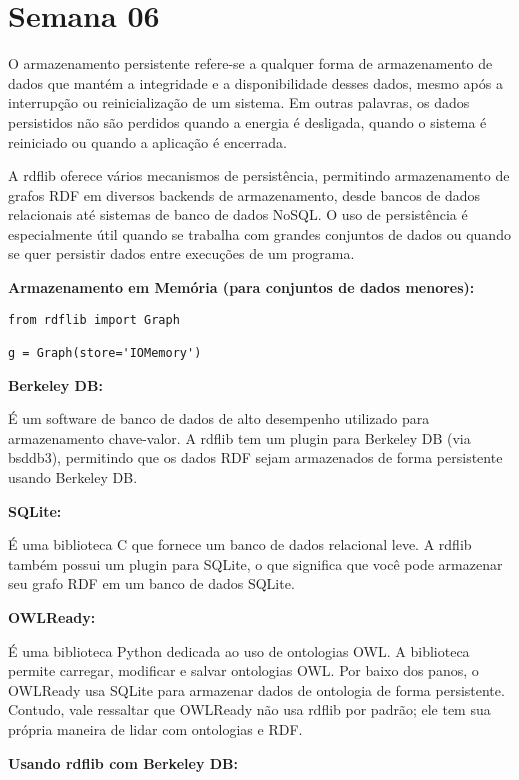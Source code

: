 \section{Semana 06}


O armazenamento persistente refere-se a qualquer forma de armazenamento de dados que mantém a integridade e a disponibilidade desses dados, mesmo após a interrupção ou reinicialização de um sistema. Em outras palavras, os dados persistidos não são perdidos quando a energia é desligada, quando o sistema é reiniciado ou quando a aplicação é encerrada.

A rdflib oferece vários mecanismos de persistência, permitindo armazenamento de grafos RDF em diversos backends de armazenamento, desde bancos de dados relacionais até sistemas de banco de dados NoSQL. O uso de persistência é especialmente útil quando se trabalha com grandes conjuntos de dados ou quando se quer persistir dados entre execuções de um programa.

\textbf{Armazenamento em Memória (para conjuntos de dados menores):}

\begin{verbatim}
from rdflib import Graph

g = Graph(store='IOMemory')
\end{verbatim}

\textbf{Berkeley DB:}

É um software de banco de dados de alto desempenho utilizado para armazenamento chave-valor. A rdflib tem um plugin para Berkeley DB (via bsddb3), permitindo que os dados RDF sejam armazenados de forma persistente usando Berkeley DB.

\textbf{SQLite:}

É uma biblioteca C que fornece um banco de dados relacional leve. A rdflib também possui um plugin para SQLite, o que significa que você pode armazenar seu grafo RDF em um banco de dados SQLite.

\textbf{OWLReady:}

É uma biblioteca Python dedicada ao uso de ontologias OWL. A biblioteca permite carregar, modificar e salvar ontologias OWL. Por baixo dos panos, o OWLReady usa SQLite para armazenar dados de ontologia de forma persistente. Contudo, vale ressaltar que OWLReady não usa rdflib por padrão; ele tem sua própria maneira de lidar com ontologias e RDF.

\textbf{Usando rdflib com Berkeley DB:}

